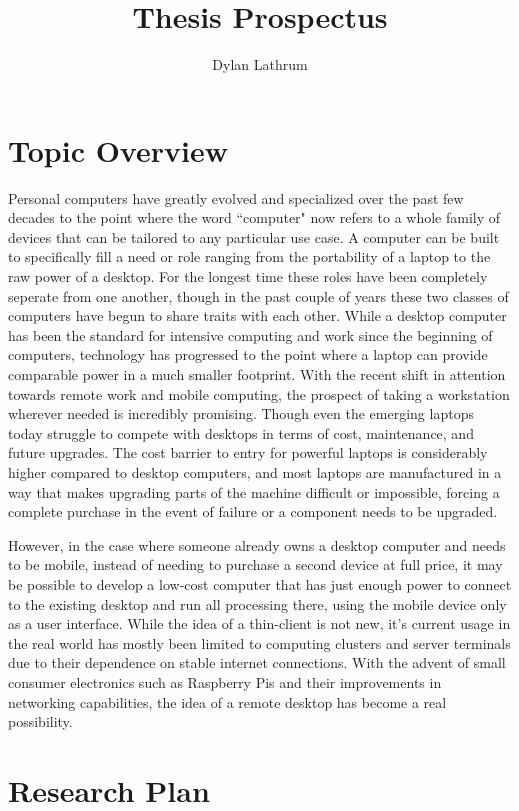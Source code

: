 \documentclass[11pt]{article}
\title{Thesis Prospectus}
\author{Dylan Lathrum}
\date{} %
\begin{document}
\maketitle

\section*{Topic Overview}

Personal computers have greatly evolved and specialized over the past few decades to the point where the word ``computer" now refers to a whole family of devices that can be tailored to any particular use case.
A computer can be built to specifically fill a need or role ranging from the portability of a laptop to the raw power of a desktop.
For the longest time these roles have been completely seperate from one another, though in the past couple of years these two classes of computers have begun to share traits with each other.
While a desktop computer has been the standard for intensive computing and work since the beginning of computers, technology has progressed to the point where a laptop can provide comparable power in a much smaller footprint.
With the recent shift in attention towards remote work and mobile computing, the prospect of taking a workstation wherever needed is incredibly promising.
Though even the emerging laptops today struggle to compete with desktops in terms of cost, maintenance, and future upgrades.
The cost barrier to entry for powerful laptops is considerably higher compared to desktop computers, and most laptops are manufactured in a way that makes upgrading parts of the machine difficult or impossible, forcing a complete purchase in the event of failure or a component needs to be upgraded.

However, in the case where someone already owns a desktop computer and needs to be mobile, instead of needing to purchase a second device at full price, it may be possible to develop a low-cost computer that has just enough power to connect to the existing desktop and run all processing there, using the mobile device only as a user interface.
While the idea of a thin-client is not new, it's current usage in the real world has mostly been limited to computing clusters and server terminals due to their dependence on stable internet connections.
With the advent of small consumer electronics such as Raspberry Pis and their improvements in networking capabilities, the idea of a remote desktop has become a real possibility.

\section*{Research Plan}
\end{document}
